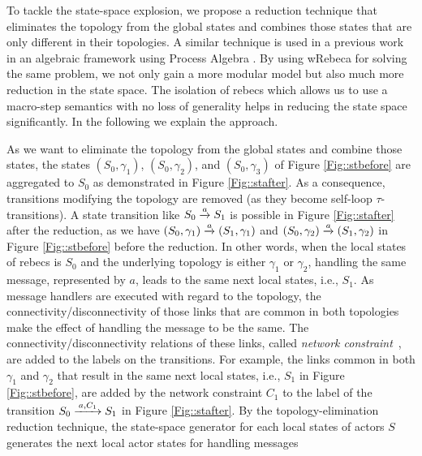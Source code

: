 To tackle the state-space explosion, we propose a   reduction  technique  that  eliminates  the  topology  from  the global  states  and  combines  those  states  that  are  only  different  in  their  topologies. A similar  technique is used in a previous work in an algebraic framework using Process Algebra \cite{FORM}. By using wRebeca for solving the same problem, we not only gain a more modular model but also much more reduction in the state space. The isolation of rebecs which allows us to use a macro-step semantics with no loss of generality helps in reducing the state space significantly. In the following we explain the approach.

As we want to eliminate  the  topology  from  the global states and combine those states,  the states $(S_0,\gamma_1)$, $(S_0,\gamma_2)$, and $(S_0,\gamma_3)$ of Figure \ref{Fig::stbefore} are aggregated to $S_0$ as demonstrated in Figure \ref{Fig::stafter}. As a consequence, transitions modifying the topology are removed (as they become self-loop $\tau$-transitions). 
A state transition like $S_0\overto{a} S_1$ is possible in Figure \ref{Fig::stafter} after the reduction, as we have $(S_0,\gamma_1)\overto{a}(S_1,\gamma_1)$ and $(S_0,\gamma_2)\overto{a}(S_1,\gamma_2)$ in Figure \ref{Fig::stbefore} before the reduction. In other words, when the local states of rebecs is $S_0$ and the underlying topology is either $\gamma_1$ or $\gamma_2$, handling the same message, represented by $a$, leads to the same next local states, i.e., $S_1$.  As message handlers are executed with regard to the topology, the connectivity/disconnectivity of those links that are common in both topologies make the effect of handling the message to be the same. The connectivity/disconnectivity relations of these links, called \emph{network constraint}~\cite{FatemehFI10,FatemehFI19},  are added to the labels on the transitions. For example, the links common in both $\gamma_{1}$ and $\gamma_{2}$ that result in the same next local states, i.e., $S_1$ in Figure \ref{Fig::stbefore}, are added by the network constraint $C_1$ to the label of the transition $S_0\overto{a,C_1}S_1$ in Figure \ref{Fig::stafter}. %
By the topology-elimination reduction technique, the state-space generator for each local states of actors $S$ %
generates the next local actor states for handling messages

